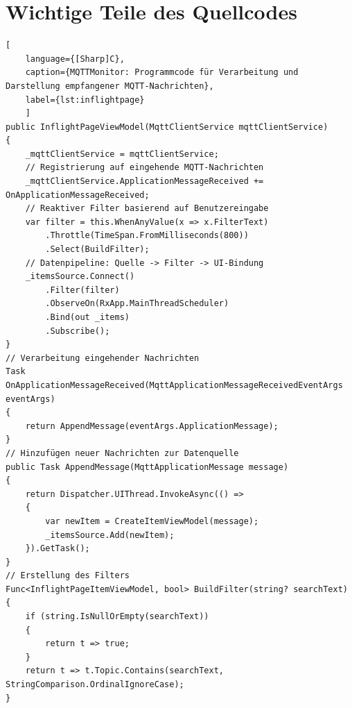 \section{Wichtige Teile des Quellcodes}
\begin{lstlisting}[
    language={[Sharp]C},
    caption={MQTTMonitor: Programmcode für Verarbeitung und Darstellung empfangener MQTT-Nachrichten},
    label={lst:inflightpage}
    ]
public InflightPageViewModel(MqttClientService mqttClientService)
{
    _mqttClientService = mqttClientService;
    // Registrierung auf eingehende MQTT-Nachrichten
    _mqttClientService.ApplicationMessageReceived += OnApplicationMessageReceived;
    // Reaktiver Filter basierend auf Benutzereingabe
    var filter = this.WhenAnyValue(x => x.FilterText)
        .Throttle(TimeSpan.FromMilliseconds(800))
        .Select(BuildFilter);
    // Datenpipeline: Quelle -> Filter -> UI-Bindung
    _itemsSource.Connect()
        .Filter(filter)
        .ObserveOn(RxApp.MainThreadScheduler)
        .Bind(out _items)
        .Subscribe();
}
// Verarbeitung eingehender Nachrichten
Task OnApplicationMessageReceived(MqttApplicationMessageReceivedEventArgs eventArgs)
{
    return AppendMessage(eventArgs.ApplicationMessage);
}
// Hinzufügen neuer Nachrichten zur Datenquelle
public Task AppendMessage(MqttApplicationMessage message)
{
    return Dispatcher.UIThread.InvokeAsync(() =>
    {
        var newItem = CreateItemViewModel(message);
        _itemsSource.Add(newItem);
    }).GetTask();
}
// Erstellung des Filters
Func<InflightPageItemViewModel, bool> BuildFilter(string? searchText)
{
    if (string.IsNullOrEmpty(searchText))
    {
        return t => true;
    }
    return t => t.Topic.Contains(searchText, StringComparison.OrdinalIgnoreCase);
}
\end{lstlisting}

